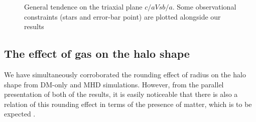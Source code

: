 \begin{figure}[!ht]
  \centering
  \hfill
  \hfill
  \caption{General tendence on the triaxial plane $c/a Vs b/a$. Some observational constraints (stars and error-bar point) are plotted alongside our results}
\end{figure}


\subsection{The effect of gas on the halo shape}
We have simultaneously corroborated the rounding effect of radius on the halo shape from DM-only and MHD simulations. However, from the parallel presentation of both of the results, it is easily noticeable that there is also a relation of this rounding effect in terms of the presence of matter, which is to be expected \cite{effect of gas}.\\


